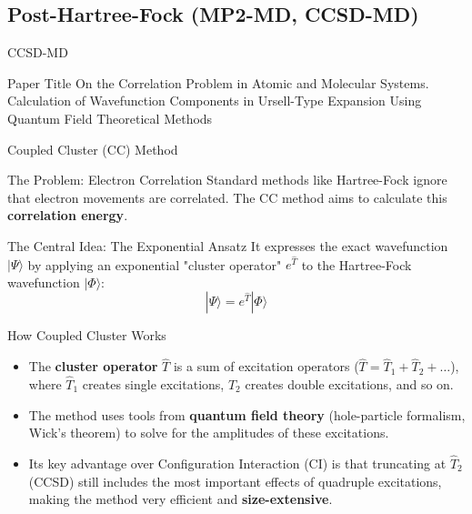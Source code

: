 \subsection{Post-Hartree-Fock (MP2-MD, CCSD-MD)}


\begin{frame}{CCSD-MD}
	\begin{block}{Paper Title}
	On the Correlation Problem in Atomic and Molecular Systems. Calculation of Wavefunction Components in Ursell-Type Expansion Using Quantum Field Theoretical Methods 
	\end{block}
\end{frame}


\begin{frame}{Coupled Cluster (CC) Method}
    \begin{block}{The Problem: Electron Correlation}
        Standard methods like Hartree-Fock ignore that electron movements are correlated. The CC method aims to calculate this \textbf{correlation energy}.
    \end{block}
    \pause

    \begin{alertblock}{The Central Idea: The Exponential Ansatz}
        It expresses the exact wavefunction $|\Psi\rangle$ by applying an exponential "cluster operator" $e^{\hat{T}}$ to the Hartree-Fock wavefunction $|\Phi\rangle$:
        \[
        |\Psi\rangle = e^{\hat{T}} |\Phi\rangle
        \]
    \end{alertblock}
\end{frame}


\begin{frame}{How Coupled Cluster Works}
    \begin{itemize}
        \item The \textbf{cluster operator} $\hat{T}$ is a sum of excitation operators ($\hat{T} = \hat{T}_1 + \hat{T}_2 + \dots$), where $\hat{T}_1$ creates single excitations, $\hat{T}_2$ creates double excitations, and so on.
        \pause
        \bigskip
        \item The method uses tools from \textbf{quantum field theory} (hole-particle formalism, Wick's theorem) to solve for the amplitudes of these excitations.
        \pause
        \bigskip
        \item Its key advantage over Configuration Interaction (CI) is that truncating at $\hat{T}_2$ (CCSD) still includes the most important effects of quadruple excitations, making the method very efficient and \textbf{size-extensive}.
    \end{itemize}
\end{frame}


